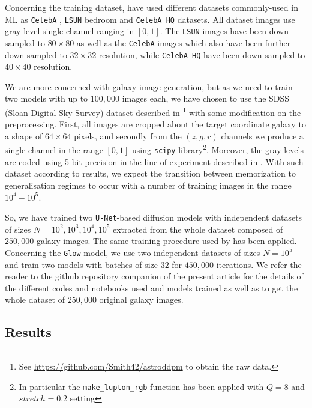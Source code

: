 \documentclass[11pt]{amsart}
\begin{document}
Concerning the training dataset, \cite{kadkhodaie2024generalization}  have used different datasets commonly-used in ML as \texttt{CelebA} \citep{Liu2015}, \texttt{LSUN} bedroom \citep{Yu2015} and  \texttt{CelebA HQ} \citep{KarrasALL18} datasets. All dataset images use  gray level single channel ranging in $[0,1]$.  The \texttt{LSUN}  images have been down sampled to $80\times 80$ as well as the \texttt{CelebA} images which also have been further down sampled to $32\times 32$ resolution, while \texttt{CelebA HQ}  have been down sampled to $40\times 40$ resolution.

We are more concerned with galaxy image generation, but as we need to train two models with up to $100,000$ images each, we have chosen to use the SDSS (Sloan Digital Sky Survey) dataset described in \citep{smith2021}\footnote{See \url{https://github.com/Smith42/astroddpm} to obtain the raw data.} with some modification on the preprocessing. First, all images are cropped about the target coordinate galaxy to a shape of $64\times 64$ pixels, and secondly from the $(z,g,r)$ channels we produce a single  channel in the range $[0,1]$ using \texttt{scipy} \citep{2020SciPy-NMeth} library\footnote{In particular the \texttt{make\_lupton\_rgb} function has been applied with $Q=8$ and $stretch=0.2$ setting}. Moreover, the gray levels are coded using 5-bit precision in the line of experiment described in \cite{Kingma2018}. With such dataset according to \cite{kadkhodaie2024generalization} results, we expect the transition between memorization to generalisation regimes to occur with a number of training images in the range $10^4-10^5$. 

So, we have trained two \texttt{U-Net}-based diffusion models with independent datasets of sizes  $N=10^2,10^3,10^4,10^5$ extracted from the whole dataset composed of $250,000$ galaxy images. The same training procedure used by \cite{kadkhodaie2024generalization} has been applied. Concerning the \texttt{Glow} model, we use two independent datasets of sizes $N=10^5$ and train two models with  batches of size $32$ for $450,000$ iterations. {\color{red} We refer the reader to the  github repository companion of the present article for the details of the different codes and notebooks used and models trained as well as to get the whole dataset of $250,000$ original galaxy images.}
%
\subsection{Results}
%
\end{document}
